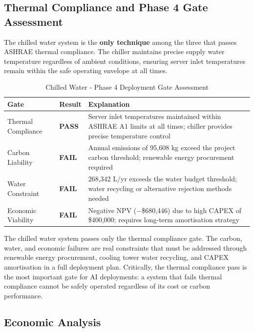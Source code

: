 ﻿\documentclass[12pt,a4paper]{report}
\newcommand{\pass}{\textcolor{passgreen}{\textbf{PASS}}}
\newcommand{\fail}{\textcolor{failred}{\textbf{FAIL}}}
\begin{document}
\subsection{Thermal Compliance and Phase 4 Gate Assessment}

The chilled water system is the \textbf{only technique} among the three that passes ASHRAE
thermal compliance. The chiller maintains precise supply water temperature regardless of
ambient conditions, ensuring server inlet temperatures remain within the safe operating
envelope at all times.

\begin{table}[H]
\centering
\caption{Chilled Water - Phase 4 Deployment Gate Assessment}
\label{tab:chw_gates}
\renewcommand{\arraystretch}{1.35}
\begin{tabular}{llp{7.5cm}}
\toprule
\textbf{Gate} & \textbf{Result} & \textbf{Explanation} \\
\midrule
Thermal Compliance & \pass & Server inlet temperatures maintained within ASHRAE A1 limits
  at all times; chiller provides precise temperature control \\
Carbon Liability & \fail & Annual emissions of 95{,}608 kg exceed the project carbon
  threshold; renewable energy procurement required \\
Water Constraint & \fail & 268{,}342 L/yr exceeds the water budget threshold; water
  recycling or alternative rejection methods needed \\
Economic Viability & \fail & Negative NPV ($-$\$680{,}446) due to high CAPEX of
  \$400{,}000; requires long-term amortisation strategy \\
\bottomrule
\end{tabular}
\end{table}

\noindent The chilled water system passes only the thermal compliance gate. The carbon, water,
and economic failures are real constraints that must be addressed through renewable energy
procurement, cooling tower water recycling, and CAPEX amortisation in a full deployment
plan. Critically, the thermal compliance pass is the most important gate for AI deployments:
a system that fails thermal compliance cannot be safely operated regardless of its cost
or carbon performance.

\subsection{Economic Analysis}
\end{document}
